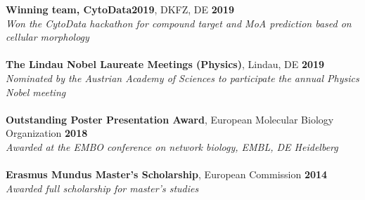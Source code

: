 \documentclass[margin,line]{resume}
\begin{document}
\begin{resume}
   \textbf{Winning team, CytoData2019}, DKFZ, DE \hfill \textbf{2019} \vspace{1mm}\\
 \textsl{Won the CytoData hackathon for compound target and MoA prediction based on cellular morphology}\vspace{-2mm}\\ \\ 
   \textbf{The Lindau Nobel Laureate Meetings (Physics)}, Lindau, DE \hfill \textbf{2019} \vspace{1mm}\\
     \textsl{Nominated by the Austrian Academy of Sciences to participate the annual Physics Nobel meeting}\vspace{-2mm}\\ \\ 
     \textbf{Outstanding Poster Presentation Award}, European Molecular Biology Organization \hfill \textbf{2018} \vspace{1mm}\\
     \textsl{Awarded at the EMBO conference on network biology, EMBL, DE Heidelberg}\vspace{-2mm}\\ \\ 
     \textbf{Erasmus Mundus Master's Scholarship}, European Commission \hfill \textbf{2014} \vspace{1mm}\\
    \textsl{Awarded full scholarship for master's studies}\vspace{-2mm}\\ \\ 

\end{resume}
\end{document}
